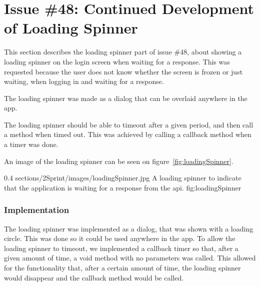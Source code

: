 \section{Issue \#48: Continued Development of Loading Spinner}
This section describes the loading spinner part of issue \#48, about showing a loading spinner on the login screen when waiting for a response. This was requested because the user does not know whether the screen is frozen or just waiting, when logging in and waiting for a response. 
 
The loading spinner was made as a dialog that can be overlaid anywhere in the app.
 
The loading spinner should be able to timeout after a given period, and then call a method when timed out. This was achieved by calling a callback method when a timer was done. 

An image of the loading spinner can be seen on figure~\ref{fig:loadingSpinner}.

        {0.4} %
        {sections/2Sprint/images/loadingSpinner.jpg} %
        {A loading spinner to indicate that the application is waiting for a response from the api.} %
        {fig:loadingSpinner} %

\subsubsection{Implementation}
The loading spinner was implemented as a dialog, that was shown with a loading circle. This was done so it could be used anywhere in the app. To allow the loading spinner to timeout, we implemented a callback timer so that, after a given amount of time, a void method with no parameters was called. This allowed for the functionality that, after a certain amount of time, the loading spinner would disappear and the callback method would be called.
